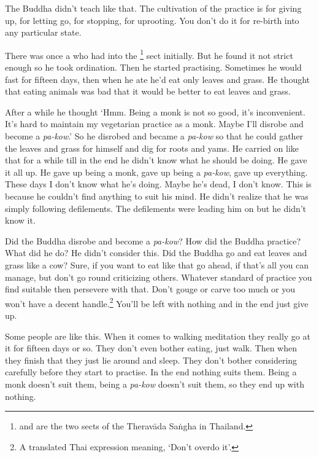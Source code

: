 The Buddha didn't teach like that. The cultivation of the practice is for giving up, for letting go, for stopping, for uprooting. You don't do it for re-birth into any particular state. 

There was once a  who had  into the \footnote{ and  are the two sects of the Therav\=ada Sa\.ngha in Thailand.} sect initially. But he found it not strict enough so he took  ordination. Then he started practising. Sometimes he would fast for fifteen days, then when he ate he'd eat only leaves and grass. He thought that eating animals was bad  that it would be better to eat leaves and grass. 

After a while he thought `Hmm. Being a monk is not so good, it's inconvenient. It's hard to maintain my vegetarian practice as a monk. Maybe I'll disrobe and become a \textit{pa-kow}.' So he disrobed and became a \textit{pa-kow} so that he could gather the leaves and grass for himself and dig for roots and yams. He carried on like that for a while till in the end he didn't know what he should be doing. He gave it all up. He gave up being a monk, gave up being a \textit{pa-kow}, gave up everything. These days I don't know what he's doing. Maybe he's dead, I don't know. This is because he couldn't find anything to suit his mind. He didn't realize that he was simply following defilements. The defilements were leading him on but he didn't know it.

Did the Buddha disrobe and become a \textit{pa-kow}? How did the Buddha practice? What did he do? He didn't consider this. Did the Buddha go and eat leaves and grass like a cow? Sure, if you want to eat like that go ahead, if that's all you can manage, but don't go round criticizing others. Whatever standard of practice you find suitable then persevere with that. Don't gouge or carve too much or you won't have a decent handle.\footnote{A translated Thai expression meaning, `Don't overdo it'.} You'll be left with nothing and in the end just give up. 

Some people are like this. When it comes to walking meditation they really go at it for fifteen days or so. They don't even bother eating, just walk. Then when they finish that they just lie around and sleep. They don't bother considering carefully before they start to practise. In the end nothing suits them. Being a monk doesn't suit them, being a \textit{pa-kow} doesn't suit them, so they end up with nothing. 

